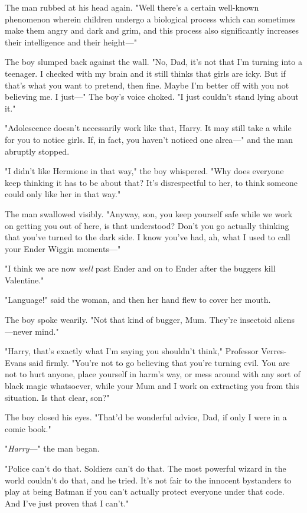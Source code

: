 The man rubbed at his head again. "Well{\el} there's a certain well-known
phenomenon wherein children undergo a biological process which can sometimes
make them angry and dark and grim, and this process also significantly
increases their intelligence and their height—"

The boy slumped back against the wall. "No, Dad, it's not that I'm turning into
a teenager. I checked with my brain and it still thinks that girls are icky.
But if that's what you want to pretend, then fine. Maybe I'm better off with
you not believing me. I just—" The boy's voice choked. "I just couldn't stand
lying about it."

"Adolescence doesn't necessarily work like that, Harry. It may still take a
while for you to notice girls. If, in fact, you haven't noticed one alrea—" and
the man abruptly stopped.

"I didn't like Hermione in that way," the boy whispered. "Why does everyone
keep thinking it has to be about that? It's disrespectful to her, to think
someone could only like her in that way."

The man swallowed visibly. "Anyway, son, you keep yourself safe while we work
on getting you out of here, is that understood? Don't you go actually thinking
that you've turned to the dark side. I know you've had, ah, what I used to call
your Ender Wiggin moments—"

"I think we are now \emph{well} past Ender and on to Ender after the buggers
kill Valentine."

"Language!" said the woman, and then her hand flew to cover her mouth.

The boy spoke wearily. "Not that kind of bugger, Mum. They're insectoid
aliens—never mind."

"Harry, that's exactly what I'm saying you shouldn't think," Professor
Verres-Evans said firmly. "You're not to go believing that you're turning evil.
You are not to hurt anyone, place yourself in harm's way, or mess around with
any sort of black magic whatsoever, while your Mum and I work on extracting you
from this situation. Is that clear, son?"

The boy closed his eyes. "That'd be wonderful advice, Dad, if only I were in a
comic book."

"\emph{Harry}—" the man began.

"Police can't do that. Soldiers can't do that. The most powerful wizard in the
world couldn't do that, and he tried. It's not fair to the innocent bystanders
to play at being Batman if you can't actually protect everyone under that code.
And I've just proven that I can't."

